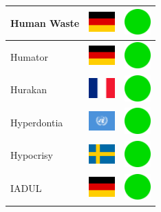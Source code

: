 \documentclass[12pt, a4paper, twoside]{report}
\begin{document}
\begin{center}
\begin{longtable}{|p{5cm}|p{2cm}|p{2cm}|}
 Human Waste                                                & \includegraphics[width=1cm]{../img/flags/de} &   \includegraphics[width=1cm]{../likes/y} \\ \hline
 Humator                                                    & \includegraphics[width=1cm]{../img/flags/de} &   \includegraphics[width=1cm]{../likes/y} \\ \hline
 Hurakan                                                    & \includegraphics[width=1cm]{../img/flags/fr} &   \includegraphics[width=1cm]{../likes/y} \\ \hline
 Hyperdontia                                                & \includegraphics[width=1cm]{../img/flags/un} &   \includegraphics[width=1cm]{../likes/y} \\ \hline
 Hypocrisy                                                  & \includegraphics[width=1cm]{../img/flags/se} &   \includegraphics[width=1cm]{../likes/y} \\ \hline
 IADUL                                                      & \includegraphics[width=1cm]{../img/flags/de} &   \includegraphics[width=1cm]{../likes/y} \\ \hline

\end{longtable}
\end{center}
\end{document}
